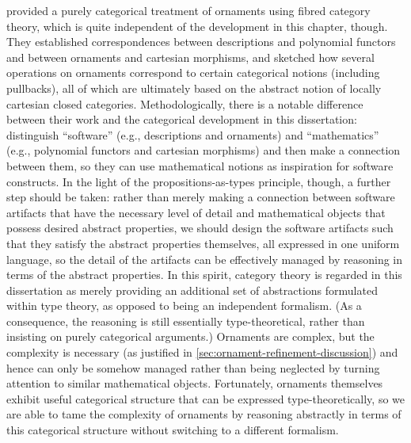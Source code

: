 \citet{Dagand-categorical-ornaments} provided a purely categorical treatment of ornaments using fibred category theory, which is quite independent of the development in this chapter, though.
They established correspondences between descriptions and polynomial functors~\citep{Gambino-polynomial-functors} and between ornaments and cartesian morphisms, and sketched how several operations on ornaments correspond to certain categorical notions (including pullbacks), all of which are ultimately based on the abstract notion of locally cartesian closed categories.
Methodologically, there is a notable difference between their work and the categorical development in this dissertation: \citeauthor{Dagand-categorical-ornaments} distinguish ``software'' (e.g., descriptions and ornaments) and ``mathematics'' (e.g., polynomial functors and cartesian morphisms) and then make a connection between them, so they can use mathematical notions as inspiration for software constructs.
In the light of the propositions-as-types principle, though, a further step should be taken: rather than merely making a connection between software artifacts that have the necessary level of detail and mathematical objects that possess desired abstract properties, we should design the software artifacts such that they satisfy the abstract properties themselves, all expressed in one uniform language, so the detail of the artifacts can be effectively managed by reasoning in terms of the abstract properties.
In this spirit, category theory is regarded in this dissertation as merely providing an additional set of abstractions formulated within type theory, as opposed to being an independent formalism.
(As a consequence, the reasoning is still essentially type-theoretical, rather than insisting on purely categorical arguments.)
Ornaments are complex, but the complexity is necessary (as justified in \autoref{sec:ornament-refinement-discussion}) and hence can only be somehow managed rather than being neglected by turning attention to similar mathematical objects.
Fortunately, ornaments themselves exhibit useful categorical structure that can be expressed type-theoretically, so we are able to tame the complexity of ornaments by reasoning abstractly in terms of this categorical structure without switching to a different formalism.

